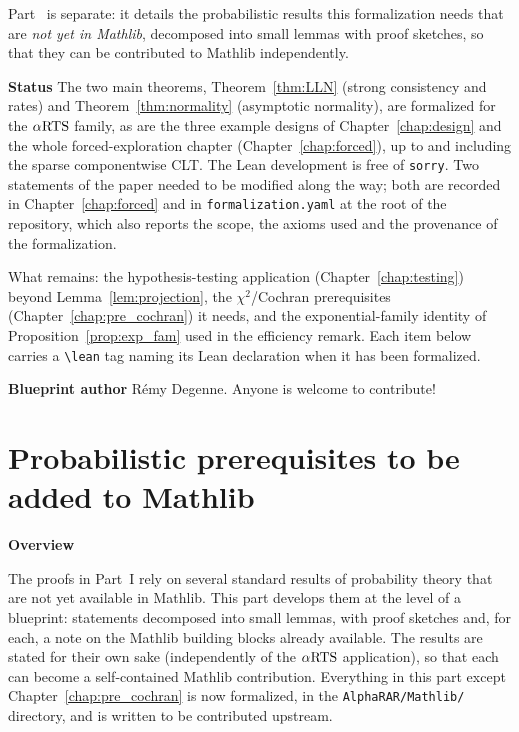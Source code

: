 Part~\ref{part:prereq} is separate: it details the probabilistic results this
formalization needs that are \emph{not yet in Mathlib}, decomposed into small
lemmas with proof sketches, so that they can be contributed to Mathlib
independently.

\textbf{Status} The two main theorems, Theorem~\ref{thm:LLN} (strong consistency and rates) and
Theorem~\ref{thm:normality} (asymptotic normality), are formalized for the $\alpha\text{RTS}$ family, as are
the three example designs of Chapter~\ref{chap:design} and the whole forced-exploration chapter
(Chapter~\ref{chap:forced}), up to and including the sparse componentwise CLT. The Lean development
is free of \texttt{sorry}. Two statements of the paper needed to be modified along the way; both are
recorded in Chapter~\ref{chap:forced} and in \texttt{formalization.yaml} at the root of the
repository, which also reports the scope, the axioms used and the provenance of the formalization.

What remains: the hypothesis-testing application (Chapter~\ref{chap:testing}) beyond
Lemma~\ref{lem:projection}, the $\chi^2$/Cochran prerequisites (Chapter~\ref{chap:pre_cochran}) it
needs, and the exponential-family identity of Proposition~\ref{prop:exp_fam} used in the efficiency
remark. Each item below carries a \texttt{\textbackslash lean} tag naming its Lean declaration when
it has been formalized.

\textbf{Blueprint author} Rémy Degenne. Anyone is welcome to contribute!











\part{Probabilistic prerequisites to be added to Mathlib}
\label{part:prereq}

\textbf{Overview}

The proofs in Part~I rely on several standard results of probability theory that
are not yet available in Mathlib. This part develops them at the level of a
blueprint: statements decomposed into small lemmas, with proof sketches and, for
each, a note on the Mathlib building blocks already available. The results are
stated for their own sake (independently of the $\alpha\text{RTS}$ application), so that
each can become a self-contained Mathlib contribution. Everything in this part
except Chapter~\ref{chap:pre_cochran} is now formalized, in the
\texttt{AlphaRAR/Mathlib/} directory, and is written to be contributed upstream.

